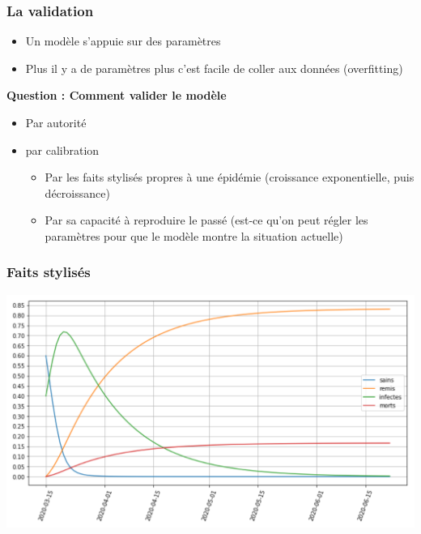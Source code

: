 \documentclass[a4paper]{cours-bdd}
\begin{document}

\begin{frame}[fragile]
  \frametitle{La validation}
  \begin{itemize}
  \item Un modèle s'appuie sur des paramètres
  \item Plus il y a de paramètres plus c'est facile de coller aux données (overfitting)
  \end{itemize}

  \bigskip
  
  \textbf{Question : Comment valider le modèle}

  \begin{itemize}
  \item Par autorité
    
  \item par calibration
    \begin{itemize}
    \item Par les faits stylisés propres à une épidémie 
      (croissance exponentielle, puis décroissance)
    \item Par sa capacité à reproduire le passé (est-ce qu'on peut régler les paramètres pour que le modèle montre la situation actuelle)
  \end{itemize}

  \end{itemize}
\end{frame}



\begin{frame}[fragile]
  \frametitle{Faits stylisés}
  
  \begin{center}
            \includegraphics[width=0.6\linewidth]{fig3_sirgm.png} \\
  \end{center}

  
\end{frame}


\end{document}

